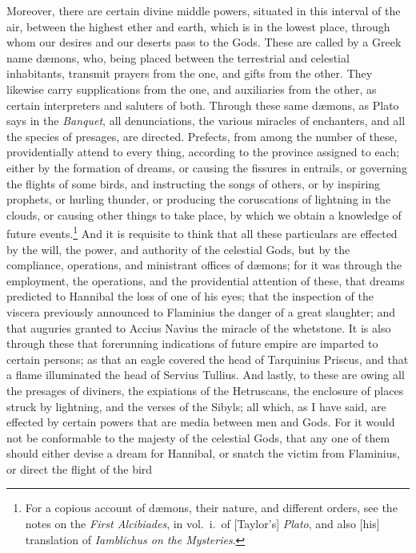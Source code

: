 \documentclass{article}
\begin{document}
Moreover, there are certain divine middle powers, situated in this interval of
the air, between the highest ether and earth, which is in the lowest place,
through whom our desires and our deserts pass to the Gods.  These are called by
a Greek name d{\ae}mons, who, being placed between the terrestrial and
celestial inhabitants, transmit prayers from the one, and gifts from the other.
They likewise carry supplications from the one, and auxiliaries from the other,
as certain interpreters and saluters of both. Through these same d{\ae}mons, as
Plato says in the \textit{Banquet}, all denunciations, the various miracles of
enchanters, and all the species of presages, are directed.  Prefects, from
among the number of these, providentially attend to every thing, according to
the province assigned to each; either by the formation of dreams, or causing
the fissures in entrails, or governing the flights of some birds, and
instructing the songs of others, or by inspiring prophets, or hurling thunder,
or producing the coruscations of lightning in the clouds, or causing other
things to take place, by which we obtain a knowledge of future
events.\footnote{For a copious account of d{\ae}mons, their nature, and
different orders, see the notes on the \textit{First Alcibiades}, in vol.~i.~of
[Taylor's] \textit{Plato}, and also [his] translation of \textit{Iamblichus on
the Mysteries}.} And it is requisite to think that all these particulars are
effected by the will, the power, and authority of the celestial Gods, but by
the compliance, operations, and ministrant offices of d{\ae}mons; for it was
through the employment, the operations, and the providential attention of
these, that dreams predicted to Hannibal the loss of one of his eyes; that the
inspection of the viscera previously announced to Flaminius the danger of a
great slaughter; and that auguries granted to Accius Navius the miracle of the
whetstone. It is also through these that forerunning indications of future
empire are imparted to certain persons; as that an eagle covered the head of
Tarquinius Priscus, and that a flame illuminated the head of Servius Tullius.
And lastly, to these are owing all the presages of diviners, the expiations of
the Hetruscans, the enclosure of places struck by lightning, and the verses of
the Sibyls; all which, as I have said, are effected by certain powers that are
media between men and Gods.  For it would not be conformable to the majesty of
the celestial Gods, that any one of them should either devise a dream for
Hannibal, or snatch the victim from Flaminius, or direct the flight of the bird
\end{document}
